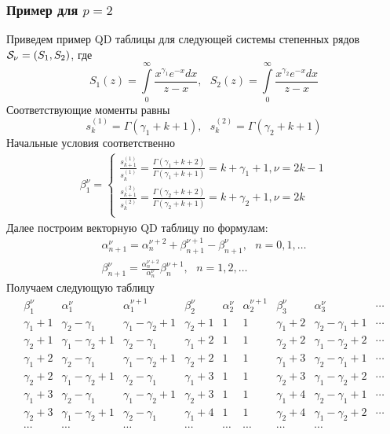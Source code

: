 \subsubsection{Пример для $p=2$} Приведем пример QD таблицы для
следующей системы степенных рядов ${\cal S}_{\nu}=(S_1,S_2)$, где
$$ S_1(z) = \int\limits_{0}^{\infty} {\frac{x^{\gamma_1} e^{-x}dx} {z-x} }, \mbox{   }
S_2(z) = \int\limits_{0}^{\infty} {\frac{x^{\gamma_2} e^{-x}dx}
{z-x} } $$ Соответствующие моменты равны
$$ s_k^{(1)} = \Gamma(\gamma_1+k+1), \mbox{   } s_k^{(2)} = \Gamma(\gamma_2+k+1) $$
Начальные условия соответственно
\begin{eqnarray}
\beta_{1}^{\nu}=\left\{
\begin{array}{llllllll}
\displaystyle\frac{s_{k+1}^{(1)}} {s_{k}^{(1)}}
=\displaystyle\frac {\Gamma(\gamma_1+k+2)}
{\Gamma(\gamma_1+k+1)}=k+\gamma_1+1
, \nu=2k-1 \\
\displaystyle\frac{s_{k+1}^{(2)}}{s_{k}^{(2)}}=\displaystyle\frac{\Gamma(\gamma_2+k+2)}{\Gamma(\gamma_2+k+1)}=k+\gamma_2+1
, \nu=2k \\
\end{array}
\right. \nonumber
\end{eqnarray}
Далее построим  векторную QD таблицу по формулам:
\begin{eqnarray*}
\alpha_{n+1}^{\nu} = \alpha_n^{\nu+2}+
\beta_{n+1}^{\nu+1}-\beta_{n+1}^{\nu},\mbox{   }n=0,1,\ldots \nonumber \\
\beta_{n+1}^{\nu}= \frac{\alpha_n^{\nu+2}} {\alpha_{n}^{\nu}}
\beta_{n}^{\nu+1},\mbox{   }n=1,2,\ldots
\end{eqnarray*}
Получаем следующую таблицу
$$%
\begin{array}{lllllllllllllllllllll}
\beta_1^{\nu}    & \alpha_1^{\nu}       & \alpha_1^{\nu+1}     & \beta_2^{\nu} & \alpha_2^{\nu} & \alpha_2^{\nu+1} & \beta_3^{\nu} & \alpha_3^{\nu} & \cdots \\
\gamma_1+1 & \gamma_2-\gamma_1   & \gamma_1-\gamma_2+1  & \gamma_2+1 & 1 & 1 & \gamma_1+2 & \gamma_2-\gamma_1+1 & \cdots \\
\gamma_2+1 & \gamma_1-\gamma_2+1 & \gamma_2-\gamma_1    & \gamma_1+2 & 1 & 1 & \gamma_2+2 & \gamma_1-\gamma_2+2 & \cdots \\
\gamma_1+2 & \gamma_2-\gamma_1   & \gamma_1-\gamma_2+1  & \gamma_2+2 & 1 & 1 & \gamma_1+3 & \gamma_2-\gamma_1+1 & \cdots \\
\gamma_2+2 & \gamma_1-\gamma_2+1 & \gamma_2-\gamma_1    & \gamma_1+3 & 1 & 1 & \gamma_2+3 & \gamma_1-\gamma_2+2 & \cdots \\
\gamma_1+3 & \gamma_2-\gamma_1   & \gamma_1-\gamma_2+1  & \gamma_2+3 & 1 & 1 & \gamma_1+4 & \gamma_2-\gamma_1+1 & \cdots \\
\gamma_2+3 & \gamma_1-\gamma_2+1 & \gamma_2-\gamma_1    & \gamma_1+4 & 1 & 1 & \gamma_2+4 & \gamma_1-\gamma_2+2 & \cdots \\
\cdots & \cdots & \cdots & \cdots & \cdots & \cdots & \cdots & \cdots \\
\end{array}
$$%
